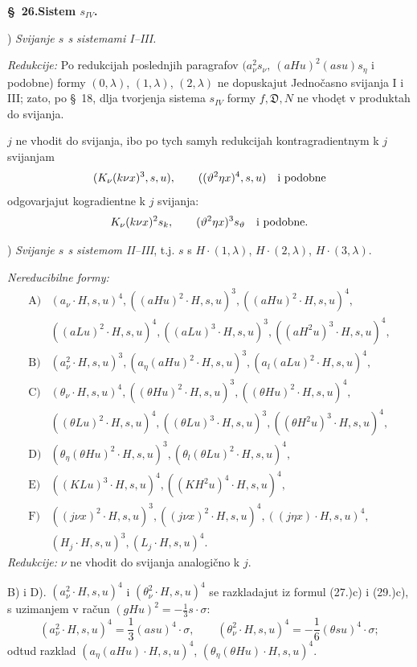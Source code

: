 \documentclass[11pt]{article}
\newcommand{\D}{\mathfrak D}
\begin{document}
\begin{center}
\textbf{\S\ 26.\quad Sistem $s_{IV}$.}
\end{center}
) \textit{Svijanje $s$ s sistemami I--III.}

\noindent\textit{Redukcije:} Po redukcijah poslednjih paragrafov $(a_\nu^2s_\nu,\ (aHu)^2(asu)s_\eta$ i podobne) formy $(0,\lambda)$, $(1,\lambda)$, $(2,\lambda)$ ne dopuskajut Jednočasno svijanja I i III; zato, po \S\ 18, dlja tvorjenja sistema $s_{IV}$ formy $f,\D,N$ ne vhodęt v produktah do svijanja.

$j$ ne vhodit do svijanja, ibo po tych samyh redukcijah kontragradientnym k $j$ svijanjam
\[
(K_\nu(k\nu x)^3,s,u),\qquad ((\vartheta^2\eta x)^4,s,u)\quad\hbox{i podobne}
\]
odgovarjajut kogradientne k $j$ svijanja:
\[
K_\nu(k\nu x)^2s_k,
\qquad (\vartheta^2\eta x)^3s_\vartheta\quad\hbox{i podobne}.
\]

) \textit{Svijanje $s$ s sistemom II--III}, t.j. $s$ s $H\cdot(1,\lambda)$, $H\cdot(2,\lambda)$, $H\cdot(3,\lambda)$.

\noindent\textit{Nereducibilne formy:}
\[
\begin{array}{rl}
\mbox{A)}&(a_\nu\cdot H,s,u)^4,
((aHu)^2\cdot H,s,u)^3,
((aHu)^2\cdot H,s,u)^4,\\[0.25em]
&((aLu)^2\cdot H,s,u)^4,
((aLu)^3\cdot H,s,u)^3,
((aH^2u)^3\cdot H,s,u)^4,\\[0.45em]
\mbox{B)}&(a_\nu^2\cdot H,s,u)^3,
(a_\eta(aHu)^2\cdot H,s,u)^3,
(a_l(aLu)^2\cdot H,s,u)^4,\\[0.45em]
\mbox{C)}&(\theta_\nu\cdot H,s,u)^4,
((\theta Hu)^2\cdot H,s,u)^3,
((\theta Hu)^2\cdot H,s,u)^4,\\[0.25em]
&((\theta Lu)^2\cdot H,s,u)^4,
((\theta Lu)^3\cdot H,s,u)^3,
((\theta H^2u)^3\cdot H,s,u)^4,\\[0.45em]
\mbox{D)}&(\theta_\eta(\theta Hu)^2\cdot H,s,u)^3,
(\theta_l(\theta Lu)^2\cdot H,s,u)^4,\\[0.45em]
\mbox{E)}&((KLu)^3\cdot H,s,u)^4,
((KH^2u)^4\cdot H,s,u)^4,\\[0.45em]
\mbox{F)}&((j\nu x)^2\cdot H,s,u)^3,
((j\nu x)^2\cdot H,s,u)^4,
((j\eta x)\cdot H,s,u)^4,\\[0.25em]
&(H_j\cdot H,s,u)^3,
(L_j\cdot H,s,u)^4.
\end{array}
\]
\noindent\textit{Redukcije:} $\nu$ ne vhodit do svijanja analogično k $j$.

\mbox{B)} i \mbox{D)}. $(a_\nu^2\cdot H,s,u)^4$ i $(\theta_\nu^2\cdot H,s,u)^4$ se razkladajut iz formul (27.)c) i (29.)c), s uzimanjem v račun $(gHu)^2=-\frac13s\cdot\sigma$:
\[
(a_\nu^2\cdot H,s,u)^4=\frac13(asu)^4\cdot\sigma,
\qquad
(\theta_\nu^2\cdot H,s,u)^4=-\frac16(\theta su)^4\cdot\sigma;
\]
odtud razklad $(a_\eta(aHu)\cdot H,s,u)^4$, $(\theta_\eta(\theta Hu)\cdot H,s,u)^4$.
\end{document}

